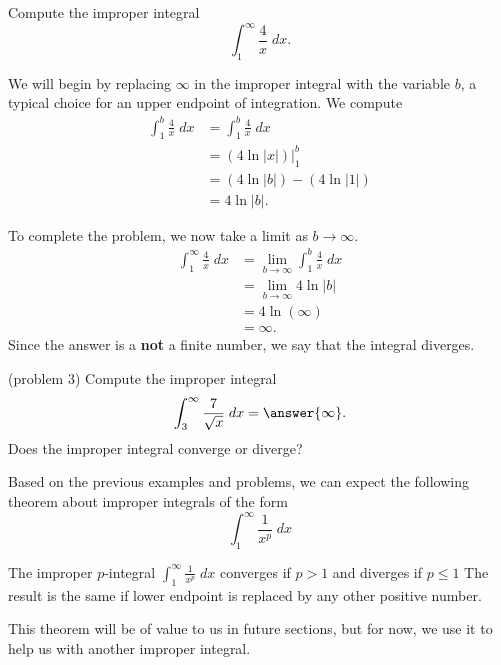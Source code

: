\documentclass[handout]{ximera}
\begin{document}
\begin{example}[example 3]
Compute the improper integral
\[
\int_1^\infty \frac{4}{x} \; dx.
\]

We will begin by replacing $\infty$ in the improper integral with the variable $b$, a typical choice for an upper endpoint of integration.
We compute
\begin{align*}
\int_1^b \frac{4}{x} \; dx &= \int_1^b \frac{4}{x} \; dx\\
                           &= \left(4\ln|x| \right) \bigg|_1^b\\
                       &= \left(4\ln|b| \right) - \left(4\ln|1| \right)\\
                       &=4\ln|b|.
\end{align*}
                       
To complete the problem, we now take a limit as $b \to \infty$.
\begin{align*}
\int_1^\infty \frac{4}{x} \; dx &= \lim_{b \to \infty}\int_1^b \frac{4}{x} \; dx\\
                       &=\lim_{b \to \infty} 4\ln|b|\\
                       &= 4\ln(\infty)\\
                       &= \infty.
\end{align*}
Since the answer is a \textbf{not} a finite number, we say that the integral diverges.

\end{example}


\begin{problem}(problem 3)
Compute the improper integral
\[
\int_3^\infty \frac{7}{\sqrt x} \; dx = \answer{\infty}.
\]
Does the improper integral converge or diverge?
\begin{multipleChoice}
\end{multipleChoice}
\end{problem}

Based on the previous examples and problems, we can expect the following theorem about improper integrals of the form
\[
\int_1^\infty \frac{1}{x^p} \; dx
\]

\begin{theorem}[$p$-integrals]
The improper $p$-integral $\int_1^\infty \frac{1}{x^p} \; dx$
 converges if $p>1$ and diverges if $p \leq 1$
The result is the same if lower endpoint is replaced by any other positive number.
\end{theorem}
This theorem will be of value to us in future sections, but for now, we use it to help us with another improper integral.
\end{document}
